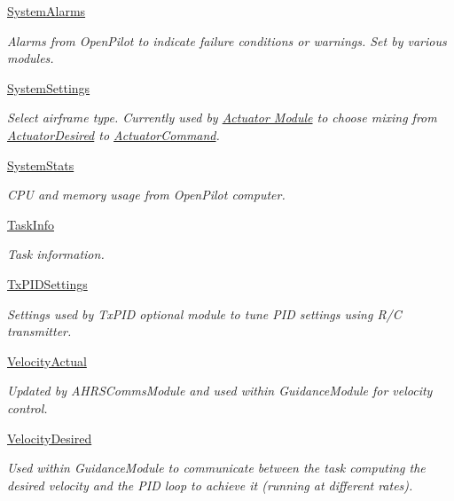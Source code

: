 \begin{DoxyCompactItemize}
\hyperlink{group___system_alarms}{\-System\-Alarms}
\begin{DoxyCompactList}\small\item\em \-Alarms from \-Open\-Pilot to indicate failure conditions or warnings. \-Set by various modules. \end{DoxyCompactList}\item 
\hyperlink{group___system_settings}{\-System\-Settings}
\begin{DoxyCompactList}\small\item\em \-Select airframe type. \-Currently used by \hyperlink{group___actuator_module}{\-Actuator \-Module} to choose mixing from \hyperlink{group___actuator_desired}{\-Actuator\-Desired} to \hyperlink{group___actuator_command}{\-Actuator\-Command}. \end{DoxyCompactList}\item 
\hyperlink{group___system_stats}{\-System\-Stats}
\begin{DoxyCompactList}\small\item\em \-C\-P\-U and memory usage from \-Open\-Pilot computer. \end{DoxyCompactList}\item 
\hyperlink{group___task_info}{\-Task\-Info}
\begin{DoxyCompactList}\small\item\em \-Task information. \end{DoxyCompactList}\item 
\hyperlink{group___tx_p_i_d_settings}{\-Tx\-P\-I\-D\-Settings}
\begin{DoxyCompactList}\small\item\em \-Settings used by \-Tx\-P\-I\-D optional module to tune \-P\-I\-D settings using \-R/\-C transmitter. \end{DoxyCompactList}\item 
\hyperlink{group___velocity_actual}{\-Velocity\-Actual}
\begin{DoxyCompactList}\small\item\em \-Updated by \-A\-H\-R\-S\-Comms\-Module and used within \-Guidance\-Module for velocity control. \end{DoxyCompactList}\item 
\hyperlink{group___velocity_desired}{\-Velocity\-Desired}
\begin{DoxyCompactList}\small\item\em \-Used within \-Guidance\-Module to communicate between the task computing the desired velocity and the \-P\-I\-D loop to achieve it (running at different rates). \end{DoxyCompactList}\item 

\end{DoxyCompactItemize}
